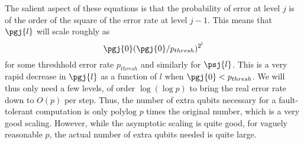 The salient aspect of these equations is that the probability of error at
level $j$ is of the order of the square of the error rate at level $j-1$.  This
means that $\pgj{l}$ will scale roughly as
\begin{equation}
	\pgj{0} (\pgj{0}/p_{thresh})^{2^l}
\end{equation}
for some threshhold error rate $p_{thresh}$ and
similarly for $\psj{l}$.  This is a very rapid decrease in $\pgj{l}$ as a
function of $l$ when $\pgj{0} < p_{thresh}$.  We will thus only need a few
levels, of order $\log (\log p)$ to bring the real error rate down to $O(p)$
per step.  Thus, the number of extra qubits necessary for a fault-tolerant
computation is only $\mbox{polylog } p$ times the original number, which
is a very good scaling.  However, while the asymptotic scaling is quite good,
for vaguely reasonable $p$, the actual number of extra qubits needed is
quite large.

